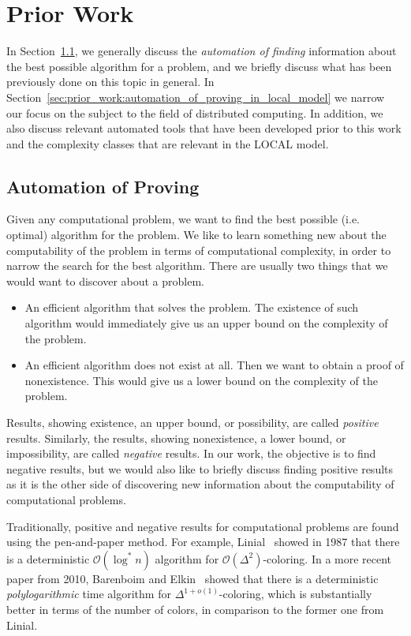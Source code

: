 
\section{Prior Work} \label{sec:prior_work}
In Section~\ref{sec:prior_work:automation_of_proving}, we generally discuss the \emph{automation of finding} information about the best possible algorithm for a problem, and we briefly discuss what has been previously done on this topic in general.
In Section~\ref{sec:prior_work:automation_of_proving_in_local_model} we narrow our focus on the subject to the field of distributed computing.
In addition, we also discuss relevant automated tools that have been developed prior to this work and the complexity classes that are relevant in the LOCAL model.

\subsection{Automation of Proving} \label{sec:prior_work:automation_of_proving}
Given any computational problem, we want to find the best possible (i.e. optimal) algorithm for the problem.
We like to learn something new about the computability of the problem in terms of computational complexity, in order to narrow the search for the best algorithm.
There are usually two things that we would want to discover about a problem.
\begin{itemize}
    \item
    An efficient algorithm that solves the problem.
    The existence of such algorithm would immediately give us an upper bound on the complexity of the problem.
    \item
    An efficient algorithm does not exist at all.
    Then we want to obtain a proof of nonexistence.
    This would give us a lower bound on the complexity of the problem.
\end{itemize}
Results, showing existence, an upper bound, or possibility, are called \emph{positive} results.
Similarly, the results, showing nonexistence, a lower bound, or impossibility, are called \emph{negative} results.
In our work, the objective is to find negative results, but we would also like to briefly discuss finding positive results as it is the other side of discovering new information about the computability of computational problems.

Traditionally, positive and negative results for computational problems are found using the pen-and-paper method.
For example, Linial\ \cite{DBLP:conf/focs/Linial87} showed in 1987 that there is a deterministic \(\mathcal{O}(\log^* n)\) algorithm for \(\mathcal{O}(\Delta^2)\)-coloring.
In a more recent paper from 2010, Barenboim and Elkin\ \cite{DBLP:conf/podc/BarenboimE10} showed that there is a deterministic \emph{polylogarithmic} time algorithm for \(\Delta^{1 + o(1)}\)-coloring, which is substantially better in terms of the number of colors, in comparison to the former one \cite{DBLP:conf/focs/Linial87} from Linial.


